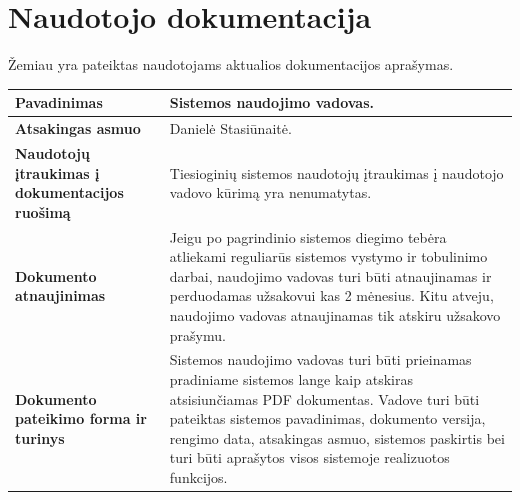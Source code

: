 \documentclass[12pt]{article}
\begin{document}
\section{Naudotojo dokumentacija}
Žemiau yra pateiktas naudotojams aktualios dokumentacijos aprašymas.

\begin{table}[htb!]
    \captionsetup{justification=centering}
    \begin{tabular}{|m{6cm}|m{10cm}|}
        \hline
        \raggedleft \textbf{\cellcolor{deepchampagne}Pavadinimas} &
        Sistemos naudojimo vadovas. \\
        \hline
        \raggedleft \textbf{\cellcolor{deepchampagne}Atsakingas asmuo} &
        Danielė Stasiūnaitė. \\
        \hline
        \raggedleft \textbf{\cellcolor{deepchampagne}Naudotojų įtraukimas į
        dokumentacijos ruošimą} & 
        Tiesioginių sistemos naudotojų įtraukimas į naudotojo vadovo kūrimą yra
        nenumatytas. \\
        \hline
        \raggedleft \textbf{\cellcolor{deepchampagne}Dokumento atnaujinimas} &
        Jeigu po pagrindinio sistemos diegimo tebėra atliekami reguliarūs
        sistemos vystymo ir tobulinimo darbai, naudojimo vadovas turi būti
        atnaujinamas ir perduodamas užsakovui kas 2 mėnesius. Kitu atveju,
        naudojimo vadovas atnaujinamas tik atskiru užsakovo prašymu. \\
        \hline
        \raggedleft \textbf{\cellcolor{deepchampagne}Dokumento pateikimo forma
        ir turinys} &
        Sistemos naudojimo vadovas turi būti prieinamas pradiniame sistemos
        lange kaip atskiras atsisiunčiamas PDF dokumentas. Vadove turi būti
        pateiktas sistemos pavadinimas, dokumento versija, rengimo data,
        atsakingas asmuo, sistemos paskirtis bei turi būti aprašytos visos
        sistemoje realizuotos funkcijos. \\
        \hline
    \end{tabular}
\end{table}

\end{document}
